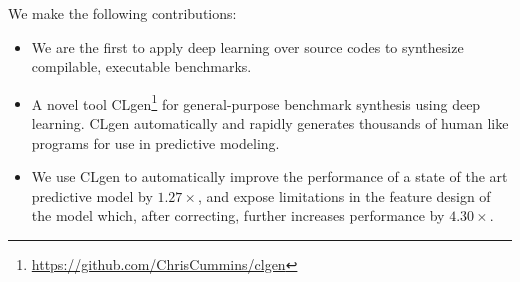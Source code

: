 We make the following contributions:%
\begin{itemize}
  \item We are the first to apply deep learning over source codes to synthesize compilable, executable benchmarks.%
  \item A novel tool CLgen\footnote{\url{https://github.com/ChrisCummins/clgen}} for general-purpose benchmark synthesis using deep learning. CLgen automatically and rapidly generates thousands of human like programs for use in predictive modeling.%
  \item We use CLgen to automatically improve the performance of a state of the art predictive model by $1.27\times$, and expose limitations in the feature design of the model which, after correcting, further increases performance by $4.30\times$.%
\end{itemize}
